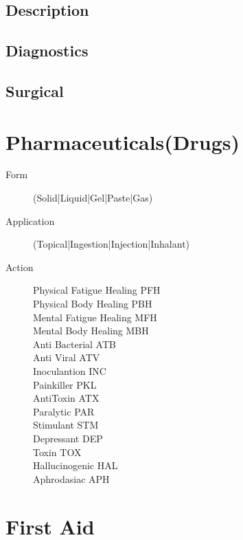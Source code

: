 \subsection{Description}
\subsection{Diagnostics}
\subsection{Surgical}
\section{Pharmaceuticals(Drugs)}

\begin{description}
	\item[Form]
	(Solid|Liquid|Gel|Paste|Gas)
	\item[Application]
	(Topical|Ingestion|Injection|Inhalant)
	\item[Action]
	\begin{description}
		\item[Physical Fatigue Healing PFH]
		\item[Physical Body Healing    PBH]
		\item[Mental Fatigue Healing	 MFH]
		\item[Mental Body Healing      MBH]
		\item[Anti Bacterial           ATB]
		\item[Anti Viral               ATV]
		\item[Inoculantion             INC]
		\item[Painkiller               PKL]
		\item[AntiToxin                ATX]
		\item[Paralytic                PAR]
		\item[Stimulant                STM]
		\item[Depressant               DEP]
		\item[Toxin                    TOX]
		\item[Hallucinogenic           HAL]
		\item[Aphrodasiac              APH]
	\end{description}    
\end{description}

\section{First Aid}



